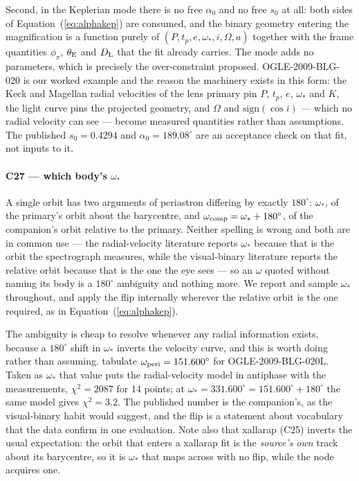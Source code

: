 Second, in the Keplerian mode there is no free $\alpha_0$ and no free $s_0$
at all: both sides of Equation~(\ref{eq:alphakep}) are consumed, and the
binary geometry entering the magnification is a function purely of
$(P, t_p, e, \omega_*, i, \Omega, a)$ together with the frame quantities
$\phi_\pi$, $\theta_{\rm E}$ and $D_{\rm L}$ that the fit already carries.
The mode adds no parameters, which is precisely the over-constraint
\citet{Skowron:2011} proposed.  OGLE-2009-BLG-020 is our worked example and
the reason the machinery exists in this form: the Keck and Magellan radial
velocities of the lens primary \citep{Yee:2016} pin $P$, $t_p$, $e$,
$\omega_*$ and $K$, the light curve pins the projected geometry, and
$\Omega$ and $\mathrm{sign}(\cos i)$ --- which no radial velocity can see
--- become measured quantities rather than assumptions.  The published
$s_0 = 0.4294$ and $\alpha_0 = 189.08^\circ$ are an acceptance check on
that fit, not inputs to it.

\paragraph{C27 --- which body's $\omega$.}  A single orbit has two
arguments of periastron differing by exactly $180^\circ$: $\omega_*$, of
the primary's orbit about the barycentre, and $\omega_{\rm comp} = \omega_*
+ 180^\circ$, of the companion's orbit relative to the primary.  Neither
spelling is wrong and both are in common use --- the radial-velocity
literature reports $\omega_*$ because that is the orbit the spectrograph
measures, while the visual-binary literature reports the relative orbit
because that is the one the eye sees --- so an $\omega$ quoted without
naming its body is a $180^\circ$ ambiguity and nothing more.  We report and
sample $\omega_*$ throughout, and apply the flip internally wherever the
relative orbit is the one required, as in Equation~(\ref{eq:alphakep}).

The ambiguity is cheap to resolve whenever any radial information exists,
because a $180^\circ$ shift in $\omega_*$ inverts the velocity curve, and
this is worth doing rather than assuming.  \citet{Yee:2016} tabulate
$\omega_{\rm peri} = 151.600^\circ$ for OGLE-2009-BLG-020L.  Taken as
$\omega_*$ that value puts the radial-velocity model in antiphase with the
measurements, $\chi^2 = 2087$ for 14 points; at $\omega_* = 331.600^\circ =
151.600^\circ + 180^\circ$ the same model gives $\chi^2 = 3.2$.  The
published number is the companion's, as the visual-binary habit would
suggest, and the flip is a statement about vocabulary that the data confirm
in one evaluation.  Note also that xallarap (C25) inverts the usual
expectation: the orbit that enters a xallarap fit is the \emph{source's
own} track about its barycentre, so it is $\omega_*$ that maps across with
no flip, while the node acquires one.

